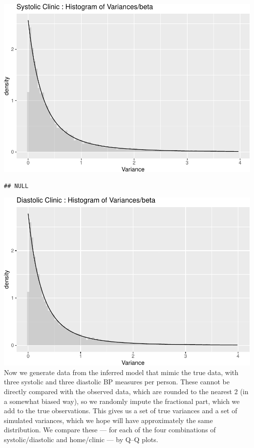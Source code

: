 \documentclass[
]{article}
\begin{document}
\includegraphics{Appendix_files/figure-latex/Variance test-1.pdf}

\begin{verbatim}
## NULL
\end{verbatim}

\includegraphics{Appendix_files/figure-latex/Variance test-2.pdf} Now we
generate data from the inferred model that mimic the true data, with
three systolic and three diastolic BP measures per person. These cannot
be directly compared with the observed data, which are rounded to the
nearest 2 (in a somewhat biased way), so we randomly impute the
fractional part, which we add to the true observations. This gives us a
set of true variances and a set of simulated variances, which we hope
will have approximately the same distribution. We compare these --- for
each of the four combinations of systolic/diastolic and home/clinic ---
by Q--Q plots.
\end{document}
